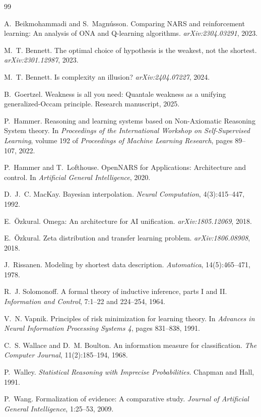 \documentclass[11pt]{article}
\theoremstyle{remark}
\begin{document}
\begin{thebibliography}{99}

A.~Beikmohammadi and S.~Magn\'usson.
\newblock Comparing NARS and reinforcement learning: An analysis of ONA and
Q-learning algorithms.
\newblock \emph{arXiv:2304.03291}, 2023.

M.~T. Bennett.
\newblock The optimal choice of hypothesis is the weakest, not the shortest.
\newblock \emph{arXiv:2301.12987}, 2023.

M.~T. Bennett.
\newblock Is complexity an illusion?
\newblock \emph{arXiv:2404.07227}, 2024.

B.~Goertzel.
\newblock Weakness is all you need: Quantale weakness as a unifying
generalized-Occam principle.
\newblock Research manuscript, 2025.

P.~Hammer.
\newblock Reasoning and learning systems based on Non-Axiomatic Reasoning
System theory.
\newblock In \emph{Proceedings of the International Workshop on
Self-Supervised Learning}, volume 192 of \emph{Proceedings of Machine Learning
Research}, pages 89--107, 2022.

P.~Hammer and T.~Lofthouse.
\newblock OpenNARS for Applications: Architecture and control.
\newblock In \emph{Artificial General Intelligence}, 2020.

D.~J.~C. MacKay.
\newblock Bayesian interpolation.
\newblock \emph{Neural Computation}, 4(3):415--447, 1992.

E.~\"Ozkural.
\newblock Omega: An architecture for AI unification.
\newblock \emph{arXiv:1805.12069}, 2018.

E.~\"Ozkural.
\newblock Zeta distribution and transfer learning problem.
\newblock \emph{arXiv:1806.08908}, 2018.

J.~Rissanen.
\newblock Modeling by shortest data description.
\newblock \emph{Automatica}, 14(5):465--471, 1978.

R.~J. Solomonoff.
\newblock A formal theory of inductive inference, parts I and II.
\newblock \emph{Information and Control}, 7:1--22 and 224--254, 1964.

V.~N. Vapnik.
\newblock Principles of risk minimization for learning theory.
\newblock In \emph{Advances in Neural Information Processing Systems 4},
pages 831--838, 1991.

C.~S. Wallace and D.~M. Boulton.
\newblock An information measure for classification.
\newblock \emph{The Computer Journal}, 11(2):185--194, 1968.

P.~Walley.
\newblock \emph{Statistical Reasoning with Imprecise Probabilities}.
\newblock Chapman and Hall, 1991.

P.~Wang.
\newblock Formalization of evidence: A comparative study.
\newblock \emph{Journal of Artificial General Intelligence}, 1:25--53, 2009.

\end{thebibliography}
\end{document}
